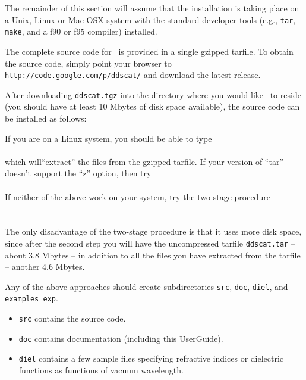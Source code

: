 The remainder of this section will assume that the installation is taking
place on a Unix, Linux or Mac OSX system 
with the standard developer tools (e.g., {\tt tar}, {\tt make}, 
and a f90 or f95 compiler) installed.

The complete source code for
\ddscatv\ is
provided in a single gzipped tarfile.
To obtain the source code, simply
point your browser to
{\tt http://code.google.com/p/ddscat/}
and download the latest release.

After downloading {\tt ddscat\subvers.tgz} 
into the directory where you would
like \ddscatv\ to reside (you should have at least 10 Mbytes of disk space
available), the source code can be installed as follows:


If you are on a Linux system, you should be able to type\\
\indent{}\\
which will``extract'' the files from the gzipped
tarfile.  If your version of ``tar'' doesn't support the ``z'' option,
then try\\
\indent{}\\
If neither of the above work on your system, try the two-stage procedure\\
\indent{} \\
\indent{} \\
The only disadvantage of the two-stage procedure is that it uses more disk
space, since after the second step you will have the uncompressed
tarfile {\tt ddscat\subvers.tar} -- about 3.8 Mbytes --
in addition to all the files you have extracted
from the tarfile -- another 4.6 Mbytes.

Any of the above approaches should 
create subdirectories {\tt src}, {\tt doc}, {\tt diel}, and {\tt examples\_exp}.
\begin{itemize}
\item {\tt src} contains the source code.
\item {\tt doc} contains documentation (including this UserGuide).
\item {\tt diel} contains a few sample files specifying refractive
indices or dielectric functions as functions of vacuum wavelength.
\end{itemize}

